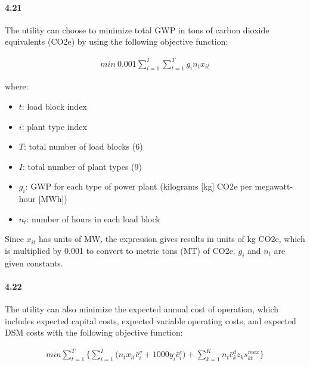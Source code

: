 \documentclass{article}
\begin{document}
\paragraph{4.21}
	The utility can choose to minimize total GWP in tons of carbon dioxide equivalents (CO2e) by using the following objective function:
	
	\begin{align*}
		min \ 0.001 \sum_{i=1}^{I} \sum_{t=1}^{T} g_i n_t x_{it}
 	\end{align*}
 	 	
 	
	where: 
	\begin{itemize}
	\item $t$: load block index
	\item $i$: plant type index
	\item $T$: total number of load blocks (6) 
	\item $I$: total number of plant types (9)
	\item $g_i$: GWP for each type of power plant (kilograms [kg] CO2e per megawatt-hour [MWh])
	\item $n_t$: number of hours in each load block
	\end{itemize}
	
	Since $x_{it}$ has units of MW, the expression gives results in units of kg CO2e, which is multiplied by 0.001 to convert to metric tons (MT) of CO2e. $g_i$ and $n_t$ are given constants.
 		
 		
 		
\paragraph{4.22}
	The utility can also minimize the expected annual cost of operation, which includes expected capital costs, expected variable operating costs, and expected DSM costs with the following objective function:
	
	\begin{align*}
		min \sum_{t=1}^{T} \bigg\{ 
		\sum_{i=1}^{I} \big( n_t x_{it} \bar{c}_i^v + 1000y_i \bar{c}_i^c \big)
		+ \sum_{k=1}^{K}  n_t \bar{c}_k^d z_k s_{kt}^{max}
		\bigg\}
	\end{align*}
		
\end{document}
